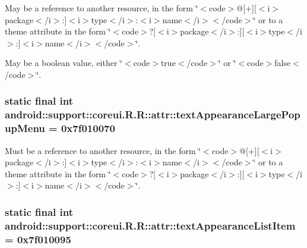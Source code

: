 May be a reference to another resource, in the form \char`\"{}$<$code$>$@\mbox{[}+\mbox{]}\mbox{[}$<$i$>$package$<$/i$>$:\mbox{]}$<$i$>$type$<$/i$>$:$<$i$>$name$<$/i$>$$<$/code$>$\char`\"{} or to a theme attribute in the form \char`\"{}$<$code$>$?\mbox{[}$<$i$>$package$<$/i$>$:\mbox{]}\mbox{[}$<$i$>$type$<$/i$>$:\mbox{]}$<$i$>$name$<$/i$>$$<$/code$>$\char`\"{}. 

May be a boolean value, either \char`\"{}$<$code$>$true$<$/code$>$\char`\"{} or \char`\"{}$<$code$>$false$<$/code$>$\char`\"{}. \hypertarget{classandroid_1_1support_1_1coreui_1_1_r_1_1attr_fd0995d2a370a66429e22e151d5043cb}{
\subsubsection[{textAppearanceLargePopupMenu}]{\setlength{\rightskip}{0pt plus 5cm}static final int android::support::coreui.R.R::attr::textAppearanceLargePopupMenu = 0x7f010070}}
\label{classandroid_1_1support_1_1coreui_1_1_r_1_1attr_fd0995d2a370a66429e22e151d5043cb}


Must be a reference to another resource, in the form \char`\"{}$<$code$>$@\mbox{[}+\mbox{]}\mbox{[}$<$i$>$package$<$/i$>$:\mbox{]}$<$i$>$type$<$/i$>$:$<$i$>$name$<$/i$>$$<$/code$>$\char`\"{} or to a theme attribute in the form \char`\"{}$<$code$>$?\mbox{[}$<$i$>$package$<$/i$>$:\mbox{]}\mbox{[}$<$i$>$type$<$/i$>$:\mbox{]}$<$i$>$name$<$/i$>$$<$/code$>$\char`\"{}. \hypertarget{classandroid_1_1support_1_1coreui_1_1_r_1_1attr_a3236af4e669dcaae430e026fae7d7f8}{
\subsubsection[{textAppearanceListItem}]{\setlength{\rightskip}{0pt plus 5cm}static final int android::support::coreui.R.R::attr::textAppearanceListItem = 0x7f010095}}
\label{classandroid_1_1support_1_1coreui_1_1_r_1_1attr_a3236af4e669dcaae430e026fae7d7f8}



